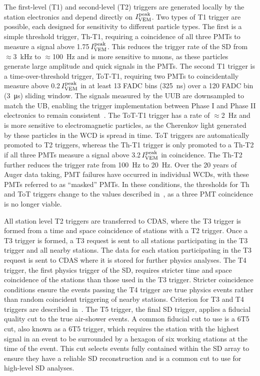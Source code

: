The first-level (T1) and second-level (T2) triggers are generated locally by the station electronics and depend directly on $I_{\rm VEM}^{\rm peak}$.
Two types of T1 trigger are possible, each designed for sensitivity to different particle types.
The first is a simple threshold trigger, Th-T1, requiring a coincidence of all three PMTs to measure a signal above 1.75$\,I_{\rm VEM}^{\rm peak}$.
This reduces the trigger rate of the SD from $\approx$\qty{3}{\kilo\hertz} to $\approx$\qty{100}{\hertz} and is more sensitive to muons, as these particles generate large amplitude and quick signals in the PMTs.
The second T1 trigger is a time-over-threshold trigger, ToT-T1, requiring two PMTs to coincidentally measure above 0.2$\,I_{\rm VEM}^{\rm peak}$ in at least 13 FADC bins (\qty{325}{\nano\second}) over a 120 FADC bin (\qty{3}{\micro\second}) sliding window.
The signals measured by the UUB are downsampled to match the UB, enabling the trigger implementation between Phase I and Phase II electronics to remain consistent~\cite{auger_jinst2023_sdeu}. 
The ToT-T1 trigger has a rate of $\approx$\qty{2}{\hertz} and is more sensitive to electromagnetic particles, as the Cherenkov light generated by these particles in the WCD is spread in time.
ToT triggers are automatically promoted to T2 triggers, whereas the Th-T1 trigger is only promoted to a Th-T2 if all three PMTs measure a signal above 3.2$\,I_{\rm VEM}^{\rm peak}$ in coincidence.
The Th-T2 further reduces the trigger rate from \qty{100}{\hertz} to \qty{20}{\hertz}.
Over the 20 years of Auger data taking, PMT failures have occurred in individual WCDs, with these PMTs referred to as ``masked'' PMTs.
In these conditions, the thresholds for Th and ToT triggers change to the values described in~\cite{auger_nima2010_sdtrigger}, as a three PMT coincidence is no longer viable.

All station level T2 triggers are transferred to CDAS, where the T3 trigger is formed from a time and space coincidence of stations with a T2 trigger.
Once a T3 trigger is formed, a T3 request is sent to all stations participating in the T3 trigger and all nearby stations.
The data for each station participating in the T3 request is sent to CDAS where it is stored for further physics analyses.
The T4 trigger, the first physics trigger of the SD, requires stricter time and space coincidence of the stations than those used in the T3 trigger.
Stricter coincidence conditions ensure the events passing the T4 trigger are true physics events rather than random coincident triggering of nearby stations.
Criterion for T3 and T4 triggers are described in~\cite{auger_nima2010_sdtrigger}.
The T5 trigger, the final SD trigger, applies a fiducial quality cut to the true air-shower events.
A common fiducial cut to use is a 6T5 cut, also known as a 6T5 trigger, which requires the station with the highest signal in an event to be surrounded by a hexagon of six working stations at the time of the event.
This cut selects events fully contained within the SD array to ensure they have a reliable SD reconstruction and is a common cut to use for high-level SD analyses.


